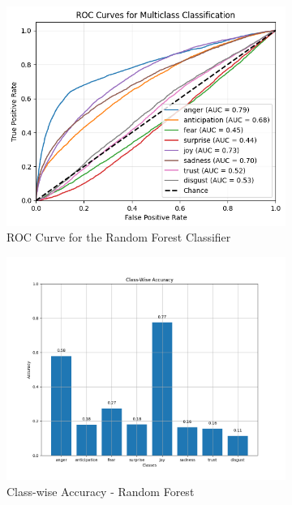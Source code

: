 \begin{figure}[H]
    \centering
    \begin{subfigure}{0.45\textwidth}
        \centering
        \includegraphics[width=\textwidth]{pictures/roc_rf.png}
        \caption{ROC Curve for the Random Forest Classifier}
        \label{fig:roc_rf}
    \end{subfigure}
    \begin{subfigure}{0.45\textwidth}
        \centering
        \includegraphics[width=\textwidth]{pictures/class_accuracy.png}
        \caption{Class-wise Accuracy - Random Forest}
        \label{fig:cwa_rf}
    \end{subfigure}
    \caption{}
    \label{fig:side_by_side}
\end{figure}


